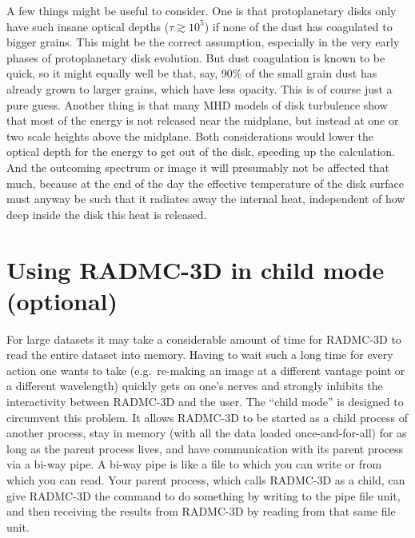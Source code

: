 \documentclass{report}
\begin{document}
A few things might be useful to consider. One is that protoplanetary disks
only have such insane optical depths ($\tau\gtrsim 10^5$) if none of the
dust has coagulated to bigger grains. This might be the correct assumption,
especially in the very early phases of protoplanetary disk evolution. But
dust coagulation is known to be quick, so it might equally well be that,
say, 90\% of the small grain dust has already grown to larger grains, which
have less opacity. This is of course just a pure guess. Another thing is
that many MHD models of disk turbulence show that most of the energy is 
not released near the midplane, but instead at one or two scale heights
above the midplane. Both considerations would lower the optical depth for
the energy to get out of the disk, speeding up the calculation. And 
the outcoming spectrum or image it will presumably not be affected that
much, because at the end of the day the effective temperature of the disk
surface must anyway be such that it radiates away the internal heat,
independent of how deep inside the disk this heat is released. 







\chapter{Using RADMC-3D in child mode (optional)}
\label{chap-child-mode}
%
For large datasets it may take a considerable amount of time for RADMC-3D to
read the entire dataset into memory. Having to wait such a long time for
every action one wants to take (e.g.\ re-making an image at a different
vantage point or a different wavelength) quickly gets on one's nerves and
strongly inhibits the interactivity between RADMC-3D and the user. The
``child mode'' is designed to circumvent this problem. It allows RADMC-3D to
be started as a child process of another process, stay in memory (with all
the data loaded once-and-for-all) for as long as the parent process lives,
and have communication with its parent process via a bi-way pipe. A bi-way
pipe is like a file to which you can write or from which you can read. Your
parent process, which calls RADMC-3D as a child, can give RADMC-3D the
command to do something by writing to the pipe file unit, and then receiving
the results from RADMC-3D by reading from that same file unit.
\end{document}
